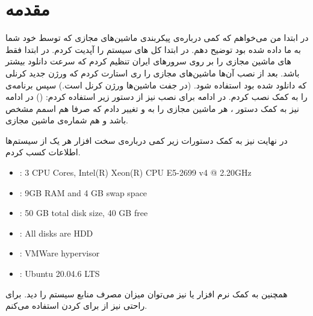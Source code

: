 \section*{مقدمه}
در ابتدا من می‌خواهم که کمی درباره‌ی پیکربندی ماشین‌های مجازی که توسط خود شما به ما داده شده بود توضیح دهم.
در ابتدا کل
های
سیستم را آپدیت کردم. در ابتدا فقط
های
ماشین مجازی را بر روی سرور‌های ایران تنظیم کردم که سرعت دانلود بیشتر باشد. بعد از نصب آن‌ها ماشین‌های مجازی را
ری استارت کردم که ورژن جدید کرنلی که دانلود شده بود استفاده شود.
(در جفت ماشین‌ها ورژن کرنل  است.)
سپس برنامه‌ی
را به کمک
نصب کردم. در ادامه برای نصب
نیز از دستور زیر استفاده کردم:
()
در ادامه نیز به کمک دستور
،
هر ماشین مجازی را به
 و 
تغییر دادم که صرفا هم اسمم مشخص باشد و هم شماره‌ی ماشین مجازی.

در نهایت نیز به کمک دستورات زیر کمی درباره‌ی سخت افزار هر یک از سیستم‌ها اطلاعات کسب کردم.
\begin{latin}
\begin{itemize}
    \item {}: 3 CPU Cores, Intel(R) Xeon(R) CPU E5-2699 v4 @ 2.20GHz
    \item {}: 9GB RAM and 4 GB swap space
    \item {}: 50 GB total disk size, 40 GB free
    \item {}: All disks are HDD
    \item {}: VMWare hypervisor
    \item {}: Ubuntu 20.04.6 LTS
\end{itemize}
\end{latin}
همچنین به کمک نرم افزار
 یا 
نیز می‌توان میزان مصرف منابع سیستم را دید. برای راحتی نیز از
برای
کردن استفاده می‌کنم.